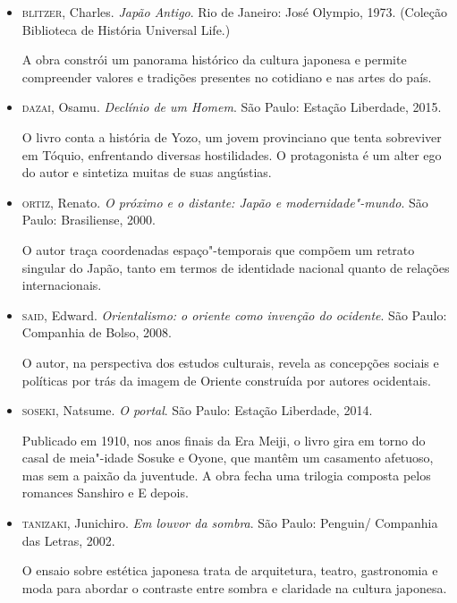 \documentclass[12pt]{extarticle}
\begin{document}
\begin{itemize} 
  \item\textsc{blitzer}, Charles. \textit{Japão Antigo}. Rio de
      Janeiro: José Olympio, 1973. (Coleção Biblioteca de História Universal
      Life.)

  A obra constrói um panorama histórico da cultura japonesa e permite
    compreender valores e tradições presentes no cotidiano e nas artes do país.


\item\textsc{dazai}, Osamu. \textit{Declínio de um Homem}. São
      Paulo: Estação Liberdade, 2015.

O livro conta a história de Yozo, um jovem provinciano que tenta sobreviver em
    Tóquio, enfrentando diversas hostilidades. O protagonista é um alter ego do
    autor e sintetiza muitas de suas angústias.


\item\textsc{ortiz}, Renato. \textit{O próximo e o distante: Japão e
  modernidade"-mundo}. São Paulo: Brasiliense, 2000.

  O autor traça coordenadas espaço"-temporais que compõem um retrato singular
    do Japão, tanto em termos de identidade nacional quanto de relações
    internacionais.

\item\textsc{said}, Edward. \textit{Orientalismo: o oriente como invenção do
  ocidente}. São Paulo: Companhia de Bolso, 2008.

  O autor, na perspectiva dos estudos culturais, revela as concepções sociais e
    políticas por trás da imagem de Oriente construída por autores ocidentais.

\item\textsc{soseki}, Natsume. \textit{O portal}. São Paulo: Estação Liberdade,
  2014.

Publicado em 1910, nos anos finais da Era Meiji, o livro gira em torno do casal
    de meia"-idade Sosuke e Oyone, que mantêm um casamento afetuoso, mas sem a
    paixão da juventude. A obra fecha uma trilogia composta pelos romances
    Sanshiro e E depois.

\item\textsc{tanizaki}, Junichiro. \textit{Em louvor da sombra}. São Paulo:
  Penguin/ Companhia das Letras, 2002.

  O ensaio sobre estética japonesa trata de arquitetura, teatro, gastronomia e
    moda para abordar o contraste entre sombra e claridade na cultura japonesa.


\end{itemize}
\end{document}
